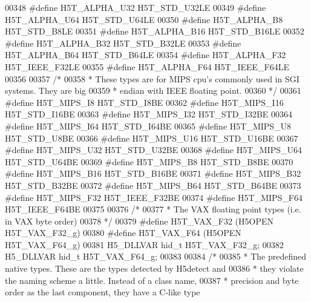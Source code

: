 \begin{DoxyCode}
00348 \textcolor{preprocessor}{#define H5T\_ALPHA\_U32       H5T\_STD\_U32LE}
00349 \textcolor{preprocessor}{#define H5T\_ALPHA\_U64       H5T\_STD\_U64LE}
00350 \textcolor{preprocessor}{#define H5T\_ALPHA\_B8        H5T\_STD\_B8LE}
00351 \textcolor{preprocessor}{#define H5T\_ALPHA\_B16       H5T\_STD\_B16LE}
00352 \textcolor{preprocessor}{#define H5T\_ALPHA\_B32       H5T\_STD\_B32LE}
00353 \textcolor{preprocessor}{#define H5T\_ALPHA\_B64       H5T\_STD\_B64LE}
00354 \textcolor{preprocessor}{#define H5T\_ALPHA\_F32       H5T\_IEEE\_F32LE}
00355 \textcolor{preprocessor}{#define H5T\_ALPHA\_F64       H5T\_IEEE\_F64LE}
00356 
00357 \textcolor{comment}{/*}
00358 \textcolor{comment}{ * These types are for MIPS cpu's commonly used in SGI systems. They are big}
00359 \textcolor{comment}{ * endian with IEEE floating point.}
00360 \textcolor{comment}{ */}
00361 \textcolor{preprocessor}{#define H5T\_MIPS\_I8     H5T\_STD\_I8BE}
00362 \textcolor{preprocessor}{#define H5T\_MIPS\_I16        H5T\_STD\_I16BE}
00363 \textcolor{preprocessor}{#define H5T\_MIPS\_I32        H5T\_STD\_I32BE}
00364 \textcolor{preprocessor}{#define H5T\_MIPS\_I64        H5T\_STD\_I64BE}
00365 \textcolor{preprocessor}{#define H5T\_MIPS\_U8     H5T\_STD\_U8BE}
00366 \textcolor{preprocessor}{#define H5T\_MIPS\_U16        H5T\_STD\_U16BE}
00367 \textcolor{preprocessor}{#define H5T\_MIPS\_U32        H5T\_STD\_U32BE}
00368 \textcolor{preprocessor}{#define H5T\_MIPS\_U64        H5T\_STD\_U64BE}
00369 \textcolor{preprocessor}{#define H5T\_MIPS\_B8     H5T\_STD\_B8BE}
00370 \textcolor{preprocessor}{#define H5T\_MIPS\_B16        H5T\_STD\_B16BE}
00371 \textcolor{preprocessor}{#define H5T\_MIPS\_B32        H5T\_STD\_B32BE}
00372 \textcolor{preprocessor}{#define H5T\_MIPS\_B64        H5T\_STD\_B64BE}
00373 \textcolor{preprocessor}{#define H5T\_MIPS\_F32        H5T\_IEEE\_F32BE}
00374 \textcolor{preprocessor}{#define H5T\_MIPS\_F64        H5T\_IEEE\_F64BE}
00375 
00376 \textcolor{comment}{/*}
00377 \textcolor{comment}{ * The VAX floating point types (i.e. in VAX byte order)}
00378 \textcolor{comment}{ */}
00379 \textcolor{preprocessor}{#define H5T\_VAX\_F32     (H5OPEN H5T\_VAX\_F32\_g)}
00380 \textcolor{preprocessor}{#define H5T\_VAX\_F64     (H5OPEN H5T\_VAX\_F64\_g)}
00381 H5\_DLLVAR hid\_t H5T\_VAX\_F32\_g;
00382 H5\_DLLVAR hid\_t H5T\_VAX\_F64\_g;
00383 
00384 \textcolor{comment}{/*}
00385 \textcolor{comment}{ * The predefined native types. These are the types detected by H5detect and}
00386 \textcolor{comment}{ * they violate the naming scheme a little.  Instead of a class name,}
00387 \textcolor{comment}{ * precision and byte order as the last component, they have a C-like type}

\end{DoxyCode}
